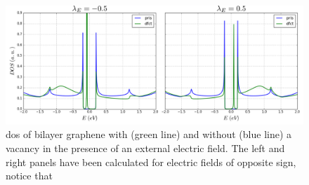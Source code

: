 \begin{figure}[h!]
\centering
\includegraphics{chapter06/figures/bilayer_dos_dfct.png}
\vspace{-5pt}
\caption{\ac{dos} of bilayer graphene with (green line) and without (blue line) a vacancy in the presence of an external electric field. The left and right panels have been calculated for electric fields of opposite sign, notice that }
\label{dos_bi_dfct}
\end{figure}
\FloatBarrier


%
%
%
%
%
%
%
%
%
%
